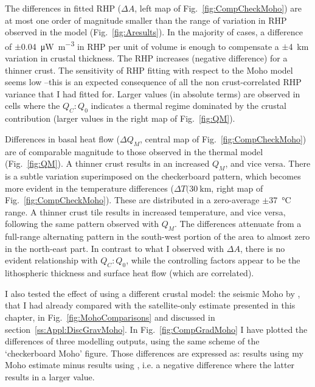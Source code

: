The differences in fitted RHP ($\Delta A$, left map of Fig.~\ref{fig:CompCheckMoho}) are at most one order of magnitude smaller than the range of variation in RHP observed in the model (Fig.~\ref{fig:Aresults}).
In the majority of cases, a difference of $\pm$\SI{0.04}{\micro \watt \per \cubic \metre} in RHP per unit of volume is enough to compensate a $\pm$\SI{4}{\kilo \metre} variation in crustal thickness.
The RHP increases (negative difference) for a thinner crust.
The sensitivity of RHP fitting with respect to the Moho model seems low --this is an expected consequence of all the non crust-correlated RHP variance that I had fitted for.
Larger values (in absolute terms) are observed in cells where the $Q_C:Q_0$ indicates a thermal regime dominated by the crustal contribution (larger values in the right map of Fig.~\ref{fig:QM}).

Differences in basal heat flow ($\Delta Q_M$, central map of Fig.~\ref{fig:CompCheckMoho}) are of comparable magnitude to those observed in the thermal model (Fig.~\ref{fig:QM}).
A thinner crust results in an increased $Q_M$, and vice versa.
There is a subtle variation superimposed on the checkerboard pattern, which becomes more evident in the temperature differences ($\Delta T(30~\mathrm{km}$, right map of Fig.~\ref{fig:CompCheckMoho}).
These are distributed in a zero-average $\pm$\SI{37}{\celsius} range.
A thinner crust tile results in increased temperature, and vice versa, following the same pattern observed with $Q_M$.
The differences attenuate from a full-range alternating pattern in the south-west portion of the area to almost zero in the north-east part.
In contrast to what I observed with $\Delta A$, there is no evident relationship with $Q_C:Q_0$, while the controlling factors appear to be the lithospheric thickness and surface heat flow (which are correlated).

I also tested the effect of using a different crustal model: the seismic Moho by \textcite{Grad2009}, that I had already compared with the satellite-only estimate presented in this chapter, in Fig.~\ref{fig:MohoComparisons} and discussed in section~\ref{ss:Appl:DiscGravMoho}.
In Fig.~\ref{fig:CompGradMoho} I have plotted the differences of three modelling outputs, using the same scheme of the `checkerboard Moho' figure.
Those differences are expressed as: results using my Moho estimate minus results using \textcite{Grad2009}, i.e. a negative difference where the latter results in a larger value.

